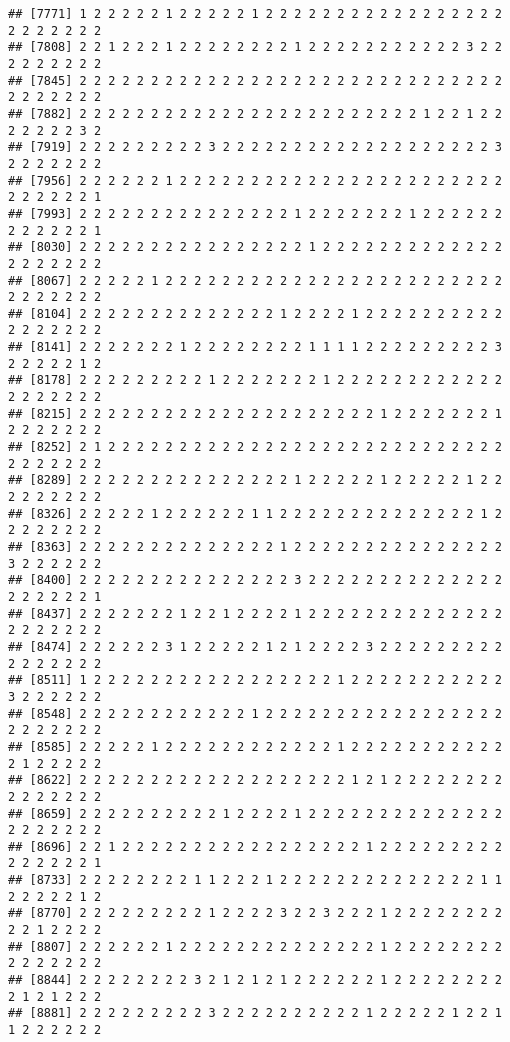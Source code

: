 \documentclass[
]{article}
\begin{document}
\begin{verbatim}
## [7771] 1 2 2 2 2 2 1 2 2 2 2 2 1 2 2 2 2 2 2 2 2 2 2 2 2 2 2 2 2 2 2 2 2 2 2 2 2
## [7808] 2 2 1 2 2 2 1 2 2 2 2 2 2 2 2 1 2 2 2 2 2 2 2 2 2 2 2 3 2 2 2 2 2 2 2 2 2
## [7845] 2 2 2 2 2 2 2 2 2 2 2 2 2 2 2 2 2 2 2 2 2 2 2 2 2 2 2 2 2 2 2 2 2 2 2 2 2
## [7882] 2 2 2 2 2 2 2 2 2 2 2 2 2 2 2 2 2 2 2 2 2 2 2 2 1 2 2 1 2 2 2 2 2 2 2 3 2
## [7919] 2 2 2 2 2 2 2 2 2 3 2 2 2 2 2 2 2 2 2 2 2 2 2 2 2 2 2 2 2 3 2 2 2 2 2 2 2
## [7956] 2 2 2 2 2 2 1 2 2 2 2 2 2 2 2 2 2 2 2 2 2 2 2 2 2 2 2 2 2 2 2 2 2 2 2 2 1
## [7993] 2 2 2 2 2 2 2 2 2 2 2 2 2 2 2 1 2 2 2 2 2 2 2 1 2 2 2 2 2 2 2 2 2 2 2 2 1
## [8030] 2 2 2 2 2 2 2 2 2 2 2 2 2 2 2 2 1 2 2 2 2 2 2 2 2 2 2 2 2 2 2 2 2 2 2 2 2
## [8067] 2 2 2 2 2 1 2 2 2 2 2 2 2 2 2 2 2 2 2 2 2 2 2 2 2 2 2 2 2 2 2 2 2 2 2 2 2
## [8104] 2 2 2 2 2 2 2 2 2 2 2 2 2 2 1 2 2 2 2 1 2 2 2 2 2 2 2 2 2 2 2 2 2 2 2 2 2
## [8141] 2 2 2 2 2 2 2 1 2 2 2 2 2 2 2 2 1 1 1 1 2 2 2 2 2 2 2 2 2 3 2 2 2 2 2 1 2
## [8178] 2 2 2 2 2 2 2 2 2 1 2 2 2 2 2 2 2 1 2 2 2 2 2 2 2 2 2 2 2 2 2 2 2 2 2 2 2
## [8215] 2 2 2 2 2 2 2 2 2 2 2 2 2 2 2 2 2 2 2 2 2 1 2 2 2 2 2 2 2 1 2 2 2 2 2 2 2
## [8252] 2 1 2 2 2 2 2 2 2 2 2 2 2 2 2 2 2 2 2 2 2 2 2 2 2 2 2 2 2 2 2 2 2 2 2 2 2
## [8289] 2 2 2 2 2 2 2 2 2 2 2 2 2 2 2 1 2 2 2 2 2 1 2 2 2 2 2 1 2 2 2 2 2 2 2 2 2
## [8326] 2 2 2 2 2 1 2 2 2 2 2 2 1 1 2 2 2 2 2 2 2 2 2 2 2 2 2 2 1 2 2 2 2 2 2 2 2
## [8363] 2 2 2 2 2 2 2 2 2 2 2 2 2 2 1 2 2 2 2 2 2 2 2 2 2 2 2 2 2 2 3 2 2 2 2 2 2
## [8400] 2 2 2 2 2 2 2 2 2 2 2 2 2 2 2 3 2 2 2 2 2 2 2 2 2 2 2 2 2 2 2 2 2 2 2 2 1
## [8437] 2 2 2 2 2 2 2 1 2 2 1 2 2 2 2 1 2 2 2 2 2 2 2 2 2 2 2 2 2 2 2 2 2 2 2 2 2
## [8474] 2 2 2 2 2 2 3 1 2 2 2 2 2 1 2 1 2 2 2 2 3 2 2 2 2 2 2 2 2 2 2 2 2 2 2 2 2
## [8511] 1 2 2 2 2 2 2 2 2 2 2 2 2 2 2 2 2 2 1 2 2 2 2 2 2 2 2 2 2 2 3 2 2 2 2 2 2
## [8548] 2 2 2 2 2 2 2 2 2 2 2 2 1 2 2 2 2 2 2 2 2 2 2 2 2 2 2 2 2 2 2 2 2 2 2 2 2
## [8585] 2 2 2 2 2 1 2 2 2 2 2 2 2 2 2 2 2 2 1 2 2 2 2 2 2 2 2 2 2 2 2 1 2 2 2 2 2
## [8622] 2 2 2 2 2 2 2 2 2 2 2 2 2 2 2 2 2 2 2 1 2 1 2 2 2 2 2 2 2 2 2 2 2 2 2 2 2
## [8659] 2 2 2 2 2 2 2 2 2 2 1 2 2 2 2 1 2 2 2 2 2 2 2 2 2 2 2 2 2 2 2 2 2 2 2 2 2
## [8696] 2 2 1 2 2 2 2 2 2 2 2 2 2 2 2 2 2 2 2 2 1 2 2 2 2 2 2 2 2 2 2 2 2 2 2 2 1
## [8733] 2 2 2 2 2 2 2 2 1 1 2 2 2 1 2 2 2 2 2 2 2 2 2 2 2 2 2 2 1 1 2 2 2 2 2 1 2
## [8770] 2 2 2 2 2 2 2 2 2 1 2 2 2 2 3 2 2 3 2 2 2 1 2 2 2 2 2 2 2 2 2 2 1 2 2 2 2
## [8807] 2 2 2 2 2 2 1 2 2 2 2 2 2 2 2 2 2 2 2 2 2 1 2 2 2 2 2 2 2 2 2 2 2 2 2 2 2
## [8844] 2 2 2 2 2 2 2 2 3 2 1 2 1 2 1 2 2 2 2 2 2 1 2 2 2 2 2 2 2 2 2 1 2 1 2 2 2
## [8881] 2 2 2 2 2 2 2 2 2 3 2 2 2 2 2 2 2 2 2 2 1 2 2 2 2 2 1 2 2 1 1 2 2 2 2 2 2

\end{verbatim}
\end{document}
